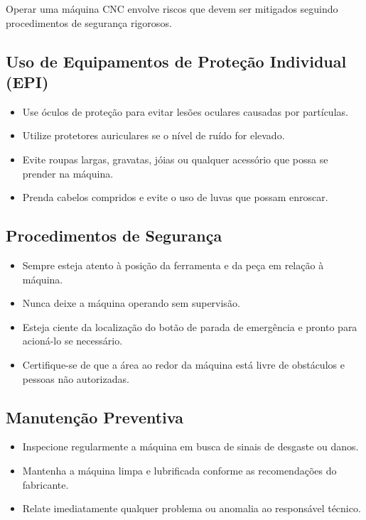 \documentclass[twoside,a4paper]{refart}
\begin{document}
Operar uma máquina CNC envolve riscos que devem ser mitigados seguindo procedimentos de segurança rigorosos.

\subsection{Uso de Equipamentos de Proteção Individual (EPI)}

\begin{itemize} \item Use óculos de proteção para evitar lesões oculares causadas por partículas. \item Utilize protetores auriculares se o nível de ruído for elevado. \item Evite roupas largas, gravatas, jóias ou qualquer acessório que possa se prender na máquina. \item Prenda cabelos compridos e evite o uso de luvas que possam enroscar. \end{itemize}

\subsection{Procedimentos de Segurança}

\begin{itemize} \item Sempre esteja atento à posição da ferramenta e da peça em relação à máquina. \item Nunca deixe a máquina operando sem supervisão. \item Esteja ciente da localização do botão de parada de emergência e pronto para acioná-lo se necessário. \item Certifique-se de que a área ao redor da máquina está livre de obstáculos e pessoas não autorizadas. \end{itemize}

\subsection{Manutenção Preventiva}

\begin{itemize} 
    \setlength{\itemindent}{-1em}
    \item Inspecione regularmente a máquina em busca de sinais de desgaste ou danos. 
    \item Mantenha a máquina limpa e lubrificada conforme as recomendações do fabricante. 
    \item Relate imediatamente qualquer problema ou anomalia ao responsável técnico. 
\end{itemize}
\end{document}
